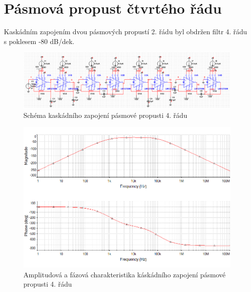 \documentclass[twoside]{article}
\begin{document}
\section{Pásmová propust čtvrtého řádu}
Kaskádním zapojením dvou pásmových propustí 2. řádu byl obdržen filtr 4. řádu s poklesem -80 dB/dek. 
\begin{figure}[H]
\centering
\includegraphics[scale=0.6]{kaskadnebandpass1.png}
\caption{Schéma kaskádního zapojení pásmové propusti 4. řádu}
\end{figure}
\begin{figure}[H]
\centering
\includegraphics[scale=0.75]{kaskadnebandpass.png}
\caption{Amplitudová a fázová charakteristika káskádního zapojení pásmové propusti 4. řádu}
\end{figure}
\end{document}
